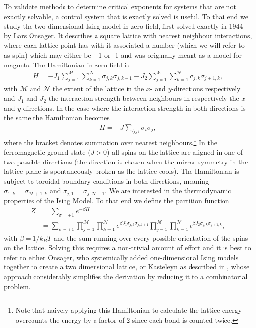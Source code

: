 \documentclass[11pt, a4paper]{report} %
\begin{document}
To validate methods to determine critical exponents for systems that are not exactly solvable, a control system that is exactly solved is useful. To that end we study the two-dimensional Ising model in zero-field, first solved exactly in 1944 by Lars Onsager.\cite{onsager:1944}
It describes a square lattice with nearest neighbour interactions, where each lattice point has with it associated a number (which we will refer to as spin) which may either be +1 or -1 and was originally meant as a model for magnets.
The Hamiltonian in zero-field is\cite{mccoy:1973}
\begin{align}
	H = -J_{1} \sum_{j=1}^{\mathcal{M}} \sum_{k=1}^{\mathcal{N}} \sigma_{j,k} \sigma_{j,k+1} - J_{2} \sum_{j=1}^{\mathcal{M}} \sum_{k=1}^{\mathcal{N}} \sigma_{j,k} \sigma_{j+1,k},
\end{align}
with \(\mathcal{M}\) and \(\mathcal{N}\) the extent of the lattice in the \(x\)- and \(y\)-directions respectively and \(J_{1}\) and \(J_{2}\) the interaction strength between neighbours in respectively the \(x\)- and \(y\)-directions.
In the case where the interaction strength in both directions is the same the Hamiltonian becomes\cite{newman:1999}
\begin{align}
	\label{eq:isotropic_hamiltonian}
	H = -J \sum_{\langle ij \rangle} \sigma_{i} \sigma_{j},
\end{align}
where the bracket denotes summation over nearest neighbours.\footnote{Note that naively applying this Hamiltonian to calculate the lattice energy overcounts the energy by a factor of 2 since each bond is counted twice.}
In the ferromagnetic ground state (\(J>0\)) all spins on the lattice are aligned in one of two possible directions (the direction is chosen when the mirror symmetry in the lattice plane is spontaneously broken as the lattice cools).
The Hamiltonian is subject to toroidal boundary conditions in both directions, meaning \(\sigma_{1,k} = \sigma_{\mathcal{M}+1,k}\) and \(\sigma_{j,1} = \sigma_{j,\mathcal{N}+1}\).
We are interested in the thermodynamic properties of the Ising Model.
To that end we define the partition function
\begin{align}
	Z &= \sum_{\sigma = \pm 1} e^{-\beta H} \\
	  &= \sum_{\sigma = \pm 1} \prod_{j=1}^{\mathcal{M}} \prod_{k=1}^{\mathcal{N}} e^{\beta J_1 \sigma_{j,k} \sigma_{j,k+1}} \prod_{j=1}^{\mathcal{M}} \prod_{k=1}^{\mathcal{N}} e^{\beta J_2 \sigma_{j,k} \sigma_{j+1,k}},
\end{align}
with \(\beta=1/k_B T\) and the sum running over every possible orientation of the spins on the lattice. Solving this requires a non-trivial amount of effort and it is best to refer to either Onsager\cite{onsager:1944}, who systemically added one-dimensional Ising models together to create a two dimensional lattice, or Kasteleyn as described in \cite{mccoy:1973}, whose approach considerably simplifies the derivation by reducing it to a combinatorial problem.
\end{document}
